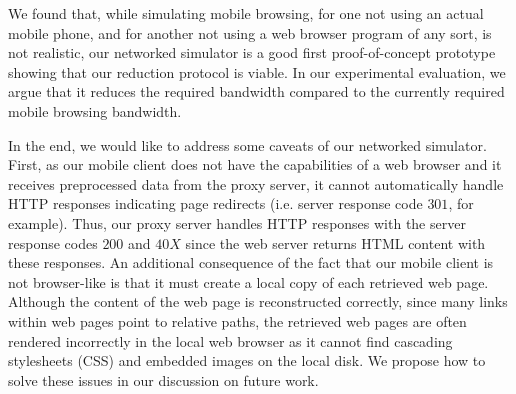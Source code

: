 We found that, while simulating mobile browsing, for one not using an actual mobile phone, and for another not using a web browser program of any sort, is not realistic, our networked simulator is a good first proof-of-concept prototype showing that our reduction protocol is viable. In our experimental evaluation, we argue that it reduces the required bandwidth compared to the currently required mobile browsing bandwidth.

In the end, we would like to address some caveats of our networked simulator. First, as our mobile client does not have the capabilities of a web browser and it receives preprocessed data from the proxy server, it cannot automatically handle HTTP responses indicating page redirects (i.e. server response code $301$, for example). Thus, our proxy server handles HTTP responses with the server response codes $200$ and $40X$ since the web server returns HTML content with these responses. An additional consequence of the fact that our mobile client is not browser-like is that it must create a local copy of each retrieved web page. Although the content of the web page is reconstructed correctly, since many links within web pages point to relative paths, the retrieved web pages are often rendered incorrectly in the local web browser as it cannot find cascading stylesheets (CSS) and embedded images on the local disk. We propose how to solve these issues in our discussion on future work.
